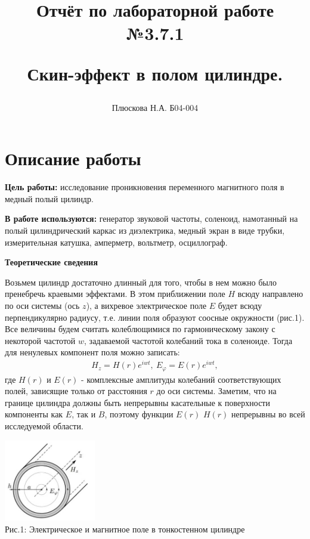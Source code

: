 \documentclass[a4paper,12pt]{report}
\title{Отчёт по лабораторной работе №3.7.1 

Скин-эффект в полом цилиндре.}
\author{Плюскова Н.А. Б04-004 }
\begin{document}
\maketitle

\section*{\huge{Описание работы}}

\noindent\textbf{Цель работы:} исследование проникновения переменного магнитного поля в медный полый цилиндр.

\noindent\textbf{В работе используются:} генератор звуковой частоты, соленоид, намотанный на полый цилиндрический каркас из диэлектрика, медный экран в виде трубки, измерительная катушка, амперметр, вольтметр, осциллограф.

\vspace{\baselineskip}
\noindent\textbf{Теоретические сведения}

Возьмем цилиндр достаточно длинный для того, чтобы в нем можно было пренебречь краевыми эффектами. В этом приближении поле $H$ всюду направлено по оси системы (ось $z$), а вихревое электрическое поле $E$ будет всюду перпендикулярно радиусу, т.е. линии поля образуют соосные окружности (рис.1). Все величины будем считать колеблющимися по гармоническому закону с некоторой частотой $w$, задаваемой частотой колебаний тока в соленоиде. Тогда для ненулевых компонент поля можно записать:
\begin{gather*}
  H_{z} = H(r)e^{iwt}, \
  E_{\varphi} = E(r)e^{iwt},
\end{gather*}
где $H(r)$ и $E(r)$ - комплексные амплитуды колебаний соответствующих полей, зависящие только от расстояния $r$ до оси системы. Заметим, что на границе цилиндра должны быть непрерывны касательные к поверхности компоненты как $E$, так и $B$, поэтому функции $E(r)$ $H(r)$ непрерывны во всей исследуемой области.

\begin{center}
	\includegraphics[width=0.3\textwidth]{рис1.jpg}\\
	\caption{Рис.1: Электрическое и магнитное поле в тонкостенном цилиндре}
\end{center}
\end{document}

